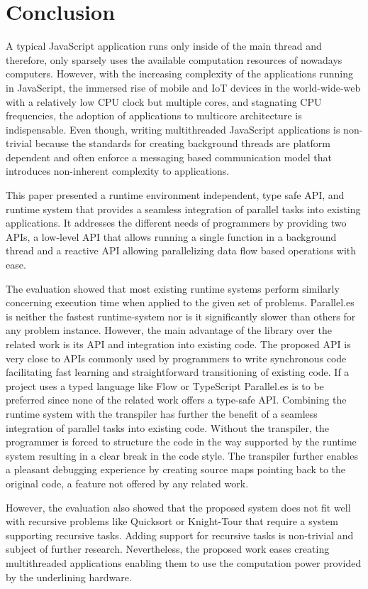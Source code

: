 \section{Conclusion}\label{sec:conclusion}
A typical JavaScript application runs only inside of the main thread and therefore, only sparsely uses the available computation resources of nowadays computers. However, with the increasing complexity of the applications running in JavaScript, the immersed rise of mobile and IoT devices in the world-wide-web with a relatively low CPU clock but multiple cores, and stagnating CPU frequencies, the adoption of applications to multicore architecture is indispensable. Even though, writing multithreaded JavaScript applications is non-trivial because the standards for creating background threads are platform dependent and often enforce a messaging based communication model that introduces non-inherent complexity to applications.

This paper presented a runtime environment independent, type safe API, and runtime system that provides a seamless integration of parallel tasks into existing applications. It addresses the different needs of programmers by providing two APIs, a low-level API that allows running a single function in a background thread and a reactive API allowing parallelizing data flow based operations with ease. 

The evaluation showed that most existing runtime systems perform similarly concerning execution time when applied to the given set of problems. Parallel.es is neither the fastest runtime-system nor is it significantly slower than others for any problem instance. However, the main advantage of the library over the related work is its API and integration into existing code.  The proposed API is very close to APIs commonly used by programmers to write synchronous code facilitating fast learning and straightforward transitioning of existing code. If a project uses a typed language like Flow or TypeScript Parallel.es is to be preferred since none of the related work offers a type-safe API. Combining the runtime system with the transpiler has further the benefit of a seamless integration of parallel tasks into existing code.  Without the transpiler, the programmer is forced to structure the code in the way supported by the runtime system resulting in a clear break in the code style. The transpiler further enables a pleasant debugging experience by creating source maps pointing back to the original code, a feature not offered by any related work.

However, the evaluation also showed that the proposed system does not fit well with recursive problems like Quicksort or Knight-Tour that require a system supporting recursive tasks. Adding support for recursive tasks is non-trivial and subject of further research. Nevertheless, the proposed work eases creating multithreaded applications enabling them to use the computation power provided by the underlining hardware. 